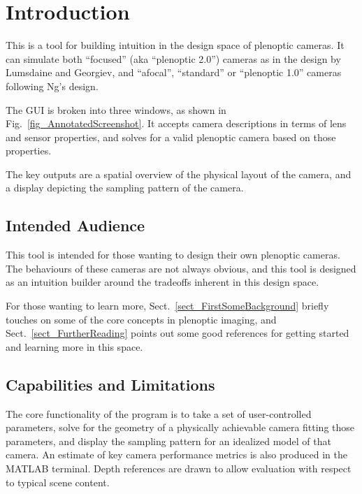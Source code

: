 \documentclass[onecolumn]{article}
\begin{document}
\section{Introduction}

This is a tool for building intuition in the design space of plenoptic cameras.  It can simulate both ``focused'' (aka ``plenoptic 2.0'') cameras as in the design by Lumsdaine and Georgiev, and ``afocal'', ``standard'' or ``plenoptic 1.0'' cameras following Ng's design.

The GUI is broken into three windows, as shown in Fig.~\ref{fig_AnnotatedScreenshot}.  It accepts camera descriptions in terms of lens and sensor properties, and solves for a valid plenoptic camera based on those properties.

The key outputs are a spatial overview of the physical layout of the camera, and a display depicting the sampling pattern of the camera.

\subsection{Intended Audience}

This tool is intended for those wanting to design their own plenoptic cameras.  The behaviours of these cameras are not always obvious, and this tool is designed as an intuition builder around the tradeoffs inherent in this design space.  

For those wanting to learn more, Sect.~\ref{sect_FirstSomeBackground} briefly touches on some of the core concepts in plenoptic imaging, and Sect.~\ref{sect_FurtherReading} points out some good references for getting started and learning more in this space.

\subsection{Capabilities and Limitations}

The core functionality of the program is to take a set of user-controlled parameters, solve for the geometry of a physically achievable camera fitting those parameters, and display the sampling pattern for an idealized model of that camera.  An estimate of key camera performance metrics is also produced in the MATLAB terminal.  Depth references are drawn to allow evaluation with respect to typical scene content.
\end{document}
